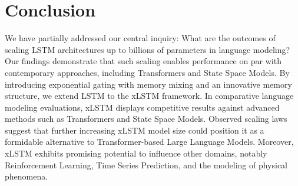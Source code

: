 \section{Conclusion}
We have partially addressed our central inquiry: What are the outcomes of scaling LSTM architectures up to billions of parameters in language modeling? Our findings demonstrate that such scaling enables performance on par with contemporary approaches, including Transformers and State Space Models. By introducing exponential gating with memory mixing and an innovative memory structure, we extend LSTM to the xLSTM framework. In comparative language modeling evaluations, xLSTM displays competitive results against advanced methods such as Transformers and State Space Models. Observed scaling laws suggest that further increasing xLSTM model size could position it as a formidable alternative to Transformer-based Large Language Models. Moreover, xLSTM exhibits promising potential to influence other domains, notably Reinforcement Learning, Time Series Prediction, and the modeling of physical phenomena.

